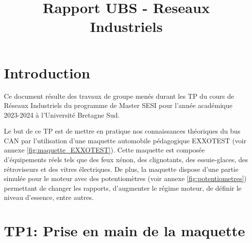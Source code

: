\documentclass{rapportECC}
\title{Rapport UBS - Reseaux Industriels} %
\begin{document}





        
\fairemarges %
\fairepagedegarde %
\tabledematieres %



\section{Introduction} 

Ce document résulte des travaux de groupe menés durant les TP du cours de Réseaux Industriels du programme de Master SESI pour l'année académique 2023-2024 à l'Université Bretagne Sud.

Le but de ce TP est de mettre en pratique nos connaissances théoriques du bus CAN par l'utilisation d'une maquette automobile pédagogique EXXOTEST (voir annexe \ref{fig:maquette_EXXOTEST}). Cette maquette est composée d'équipements réels tels que des feux xénon, des clignotants, des essuie-glaces, des rétroviseurs et des vitres électriques. De plus, la maquette dispose d'une partie simulée pour le moteur avec des potentiomètres (voir annexe \ref{fig:potentiometres}) permettant de changer les rapports, d'augmenter le régime moteur, de définir le niveau d'essence, entre autres.


\section{TP1: Prise en main de la maquette}

\end{document}
